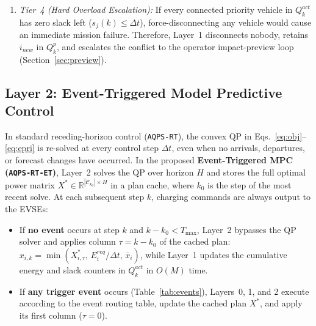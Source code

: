 \documentclass[final,3p,times,twocolumn]{elsarticle}
\begin{document}
\begin{enumerate}
    \item \textit{Tier~4 (Hard Overload Escalation):} If every connected priority vehicle in $Q_k^{act}$ has zero slack left ($s_j(k) \le \Delta t$), force-disconnecting any vehicle would cause an immediate mission failure. Therefore, Layer~1 disconnects nobody, retains $i_{new}$ in $Q_k^p$, and escalates the conflict to the operator impact-preview loop (Section~\ref{sec:preview}).
\end{enumerate}

\subsection{Layer 2: Event-Triggered Model Predictive Control}
\label{sec:event_mpc}

In standard receding-horizon control (\texttt{AQPS-RT}), the convex QP in Eqs.~\eqref{eq:obj}--\eqref{eq:epri} is re-solved at every control step $\Delta t$, even when no arrivals, departures, or forecast changes have occurred. In the proposed \textbf{Event-Triggered MPC (\texttt{AQPS-RT-ET})}, Layer~2 solves the QP over horizon $H$ and stores the full optimal power matrix $X^* \in \mathbb{R}^{|\mathcal{C}_{k_0}| \times H}$ in a plan cache, where $k_0$ is the step of the most recent solve. At each subsequent step $k$, charging commands are always output to the EVSEs:
\begin{itemize}
    \item If \textbf{no event} occurs at step $k$ and $k - k_0 < T_{\max}$, Layer~2 bypasses the QP solver and applies column $\tau = k - k_0$ of the cached plan: $x_{i,k} = \min(X^*_{i,\tau}, \, E_i^{req}/\Delta t, \, \bar{x}_i)$, while Layer~1 updates the cumulative energy and slack counters in $Q_k^{act}$ in $O(M)$ time.
    \item If \textbf{any trigger event} occurs (Table~\ref{tab:events}), Layers~0, 1, and 2 execute according to the event routing table, update the cached plan $X^*$, and apply its first column ($\tau = 0$).
\end{itemize}
\end{document}
